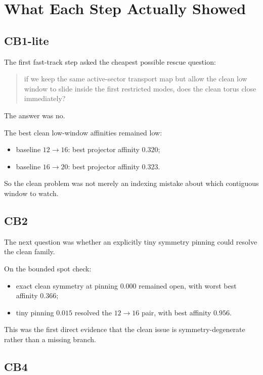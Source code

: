 \documentclass[11pt]{article}
\begin{document}
\section{What Each Step Actually Showed}

\subsection{CB1-lite}

The first fast-track step asked the cheapest possible rescue question:

\begin{quote}
if we keep the same active-sector transport map but allow the clean low window to slide inside the first restricted modes, does the clean torus close immediately?
\end{quote}

The answer was no.

The best clean low-window affinities remained low:
\begin{itemize}
\item baseline \(12 \rightarrow 16\): best projector affinity \(0.320\);
\item baseline \(16 \rightarrow 20\): best projector affinity \(0.323\).
\end{itemize}

So the clean problem was not merely an indexing mistake about which contiguous window to watch.

\subsection{CB2}

The next question was whether an explicitly tiny symmetry pinning could resolve the clean family.

On the bounded spot check:
\begin{itemize}
\item exact clean symmetry at pinning \(0.000\) remained open, with worst best affinity \(0.366\);
\item tiny pinning \(0.015\) resolved the \(12 \rightarrow 16\) pair, with best affinity \(0.956\).
\end{itemize}

This was the first direct evidence that the clean issue is symmetry-degenerate rather than a missing branch.

\subsection{CB4}
\end{document}
